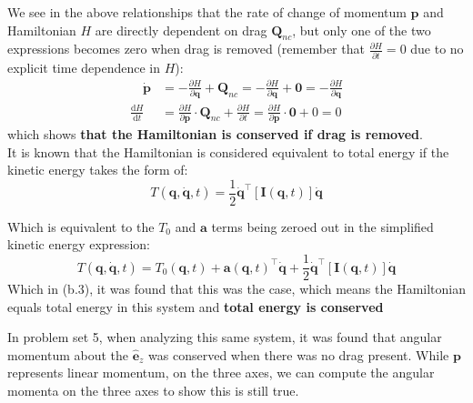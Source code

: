 \documentclass[titlepage]{article}
\begin{document}
\begin{mdframed}[linewidth=1pt, innertopmargin=10pt, innerbottommargin=10pt]
	We see in the above relationships that the rate of change of momentum $\boldsymbol{p}$ and Hamiltonian $H$ are directly dependent on drag $\boldsymbol{Q}_{nc}$, but only one of the two expressions becomes zero when drag is removed (remember that $\frac{\partial H}{\partial t}=0$ due to no explicit time dependence in $H$):
	\begin{equation}
		\begin{split}
			\quad\dot{\boldsymbol{p}}&=-\frac{\partial H}{\partial\boldsymbol{q}}+\boldsymbol{Q}_{nc}=-\frac{\partial H}{\partial\boldsymbol{q}}+\boldsymbol{0}=-\frac{\partial H}{\partial\boldsymbol{q}} \\
			\frac{\mathrm{d}H}{\mathrm{d}t}&=\frac{\partial H}{\partial\boldsymbol{p}}\cdot\boldsymbol{Q}_{nc}+\frac{\partial H}{\partial t}=\frac{\partial H}{\partial\boldsymbol{p}}\cdot\boldsymbol{0}+0=0
		\end{split}
	\end{equation}
	which shows \textbf{that the Hamiltonian is conserved if drag is removed}.\\
	
	It is known that the Hamiltonian is considered equivalent to total energy if the kinetic energy takes the form of:
	\begin{equation}
		T(\boldsymbol{q},\dot{\boldsymbol{q}},t)=\frac{1}{2}\dot{\boldsymbol{q}}^\top[\boldsymbol{I}(\boldsymbol{q},t)]\dot{\boldsymbol{q}}
	\end{equation}
	
	Which is equivalent to the $T_0$ and $\boldsymbol{a}$ terms being zeroed out in the simplified kinetic energy expression:
	\begin{equation}
		T(\boldsymbol{q},\dot{\boldsymbol{q}},t)=T_0(\boldsymbol{q},t)+\boldsymbol{a}(\boldsymbol{q},t)^\top\dot{\boldsymbol{q}}+\frac{1}{2}\dot{\boldsymbol{q}}^\top[\boldsymbol{I}(\boldsymbol{q},t)]\dot{\boldsymbol{q}}
	\end{equation}
	Which in (b.3), it was found that this was the case, which means the Hamiltonian equals total energy in this system and \textbf{total energy is conserved}
\end{mdframed}

In problem set 5, when analyzing this same system, it was found that angular momentum about the $\hat{\boldsymbol{e}}_z$ was conserved when there was no drag present. While $\boldsymbol{p}$ represents linear momentum, on the three axes, we can compute the angular momenta on the three axes to show this is still true.\\
\end{document}
